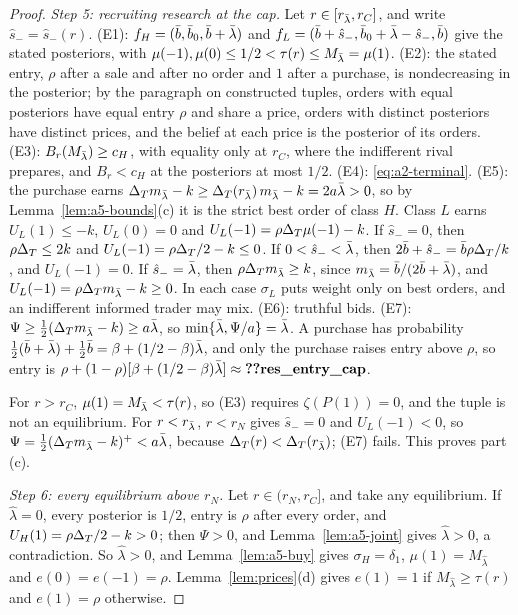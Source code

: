 \begin{proof}
\emph{Step 5: recruiting research at the cap.} Let \(r\in[r_{\bar\lambda},r_C]\), and write \(\hat s_-=\hat s_-(r)\). (E1):
\(f_H=(\bar b,\bar b_0,\bar b+\bar\lambda)\) and \(f_L=(\bar b+\hat s_-,\bar b_0+\bar\lambda-\hat s_-,\bar b)\) give the stated
posteriors, with \(\mu(-1),\mu(0)\le1/2<\tau(r)\le M_{\bar\lambda}=\mu(1)\). (E2): the stated entry, \(\rho\) after a sale and
after no order and \(1\) after a purchase, is nondecreasing in the posterior; by the paragraph on constructed tuples,
orders with equal posteriors have equal entry \(\rho\) and share a price, orders with distinct posteriors have
distinct prices, and the belief at each price is the posterior of its orders. (E3): \(B_r(M_{\bar\lambda})\ge c_H\), with
equality only at \(r_C\), where the indifferent rival prepares, and \(B_r<c_H\) at the posteriors at most
\(1/2\). (E4): \eqref{eq:a2-terminal}. (E5): the purchase earns \(\Delta_T m_{\bar\lambda}-k\ge\Delta_T(r_{\bar\lambda})\,m_{\bar\lambda}-k=2a\bar\lambda>0\),
so by Lemma~\ref{lem:a5-bounds}(c) it is the strict best order of class \(H\). Class \(L\) earns \(U_L(1)\le-k\),
\(U_L(0)=0\) and \(U_L(-1)=\rho\Delta_T\mu(-1)-k\). If \(\hat s_-=0\), then \(\rho\Delta_T\le2k\) and
\(U_L(-1)=\rho\Delta_T/2-k\le0\). If \(0<\hat s_-<\bar\lambda\), then \(2\bar b+\hat s_-=\bar b\rho\Delta_T/k\), and \(U_L(-1)=0\). If
\(\hat s_-=\bar\lambda\), then \(\rho\Delta_T m_{\bar\lambda}\ge k\), since \(m_{\bar\lambda}=\bar b/(2\bar b+\bar\lambda)\), and
\(U_L(-1)=\rho\Delta_T m_{\bar\lambda}-k\ge0\). In each case \(\sigma_L\) puts weight only on best orders, and an indifferent
informed trader may mix. (E6): truthful bids. (E7): \(\Psi\ge\tfrac12(\Delta_T m_{\bar\lambda}-k)\ge a\bar\lambda\), so
\(\min\{\bar\lambda,\Psi/a\}=\bar\lambda\). A purchase has probability \(\tfrac12(\bar b+\bar\lambda)+\tfrac12\bar b=\beta+(1/2-\beta)\bar\lambda\), and
only the purchase raises entry above \(\rho\), so entry is \(\rho+(1-\rho)[\beta+(1/2-\beta)\lb]\approx\reg{res_entry_cap}\).

For \(r>r_C\), \(\mu(1)=M_{\bar\lambda}<\tau(r)\), so (E3) requires \(\zeta(P(1))=0\), and the tuple is not an equilibrium. For
\(r<r_{\bar\lambda}\), \(r<r_N\) gives \(\hat s_-=0\) and \(U_L(-1)<0\), so \(\Psi=\tfrac12(\Delta_T m_{\bar\lambda}-k)^+<a\bar\lambda\), because
\(\Delta_T(r)<\Delta_T(r_{\bar\lambda})\); (E7) fails. This proves part (c).

\emph{Step 6: every equilibrium above \(r_N\).} Let \(r\in(r_N,r_C]\), and take any equilibrium. If
\(\hat\lambda=0\), every posterior is \(1/2\), entry is \(\rho\) after every order, and \(U_H(1)=\rho\Delta_T/2-k>0\); then
\(\Psi>0\), and Lemma~\ref{lem:a5-joint} gives \(\hat\lambda>0\), a contradiction. So \(\hat\lambda>0\), and
Lemma~\ref{lem:a5-buy} gives \(\sigma_H=\delta_1\), \(\mu(1)=M_{\hat\lambda}\) and \(e(0)=e(-1)=\rho\).
Lemma~\ref{lem:prices}(d) gives \(e(1)=1\) if \(M_{\hat\lambda}\ge\tau(r)\) and \(e(1)=\rho\) otherwise.


\end{proof}
